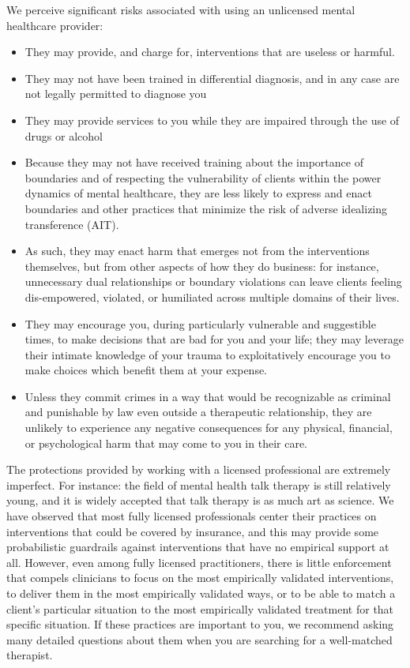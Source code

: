 \documentclass[12pt,letterpaper]{book}
\begin{document}
We perceive significant risks associated with using an unlicensed mental healthcare provider:
\begin{itemize}
    \item They may provide, and charge for, interventions that are useless or harmful.
    \item They may not have been trained in differential diagnosis, and in any case are not legally permitted to diagnose you
    \item They may provide services to you while they are impaired through the use of drugs or alcohol
    \item Because they may not have received training about the importance of boundaries and of respecting the vulnerability of clients within the power dynamics of mental healthcare, they are less likely to express and enact boundaries and other practices that minimize the risk of adverse idealizing transference (AIT).
    \item As such, they may enact harm that emerges not from the interventions themselves, but from other aspects of how they do business: for instance, unnecessary dual relationships or boundary violations can leave clients feeling dis-empowered, violated, or humiliated across multiple domains of their lives.
    \item They may encourage you, during particularly vulnerable and suggestible times, to make decisions that are bad for you and your life; they may leverage their intimate knowledge of your trauma to exploitatively encourage you to make choices which benefit them at your expense.
    \item Unless they commit crimes in a way that would be recognizable as criminal and punishable by law even outside a therapeutic relationship, they are unlikely to experience any negative consequences for any physical, financial, or psychological harm that may come to you in their care.
\end{itemize}

The protections provided by working with a licensed professional are extremely imperfect. For instance: the field of mental health talk therapy is still relatively young, and it is widely accepted that talk therapy is as much art as science. We have observed that most fully licensed professionals center their practices on interventions that could be covered by insurance, and this may provide some probabilistic guardrails against interventions that have no empirical support at all. However, even among fully licensed practitioners, there is little enforcement that compels clinicians to focus on the most empirically validated interventions, to deliver them in the most empirically validated ways, or to be able to match a client's particular situation to the most empirically validated treatment for that specific situation. If these practices are important to you, we recommend asking many detailed questions about them when you are searching for a well-matched therapist. 
\end{document}
